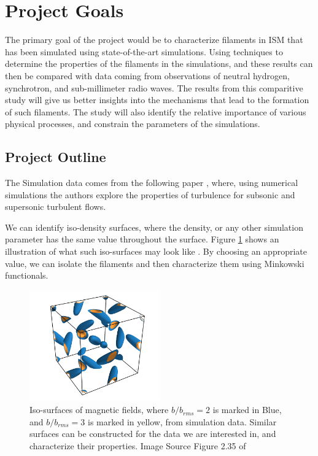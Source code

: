 \documentclass{article}
\begin{document}
\section{Project Goals}
The primary goal of the project would be to characterize filaments in ISM that has been simulated using state-of-the-art simulations. Using techniques to determine the properties of the filaments in the simulations, and these results can then be compared with data coming from observations of neutral hydrogen, synchrotron, and sub-millimeter radio waves. The results from this comparitive study will give us better insights into the mechanisms that lead to the formation of such filaments. The study will also identify the relative importance of various physical processes, and constrain the parameters of the simulations.

\subsection{Project Outline}
The Simulation data comes from the following paper \cite{DataPaper}, where, using numerical simulations the authors explore the properties of turbulence for subsonic and supersonic turbulent flows. 

We can identify iso-density surfaces, where the density, or any other simulation parameter has the same value throughout the surface. Figure \ref{fig:b_field_isosurfaces} shows an illustration of what such iso-surfaces may look like \cite{AmitSetaThesis}. By choosing an appropriate value, we can isolate the filaments and then characterize them using Minkowski functionals. 


\begin{figure}[h!]
    \centering
    \includegraphics[width=0.5\textwidth]{Images/b_field_isosurfaces.png}
    \caption{Iso-surfaces of magnetic fields, where $b/b_{rms} = 2$ is marked in Blue, and $b/b_{rms} = 3$ is marked in yellow, from simulation data. Similar surfaces can be constructed for the data we are interested in, and characterize their properties. Image Source Figure 2.35 of \cite{AmitSetaThesis}}
    \label{fig:b_field_isosurfaces}
\end{figure}
\end{document}
